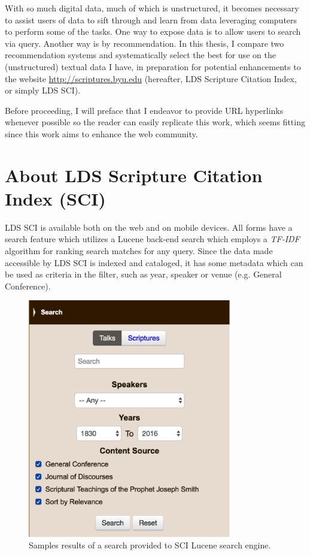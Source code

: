 With so much digital data, much of which is unstructured, it becomes necessary to assist users of data to sift through and learn from data leveraging computers to perform some of the tasks. One way to expose data is to allow users to search via query. Another way is by recommendation. In this thesis, I compare two recommendation systems and systematically select the best for use on the (unstructured) textual data I have, in preparation for potential enhancements to the website \url{http://scriptures.byu.edu} (hereafter, LDS Scripture Citation Index, or simply LDS SCI).




Before proceeding, I will preface that I endeavor to provide URL hyperlinks whenever possible so the reader can easily replicate this work, which seems fitting since this work aims to enhance the web community.

\section{About LDS Scripture Citation Index (SCI)}
LDS SCI is available both on the web and on mobile devices. All forms have a search feature which utilizes a Lucene \citep{lucene:luke} back-end search which employs a \emph{TF-IDF} algorithm for ranking search matches for any query. Since the data made accessible by LDS SCI is indexed and cataloged, it has some metadata which can be used as criteria in the filter, such as year, speaker or venue (e.g. General Conference).

\begin{figure}[hhhhhtb]
	\centering
		\includegraphics[width=3.5in,natwidth=310,natheight=442]{figures/sci_search.png}
		\caption[SCI \emph{TF-IDF} Search Results]{
			Samples results of a search provided to SCI Lucene search engine.
		}
	\label{fig:sci_search}
\end{figure}

